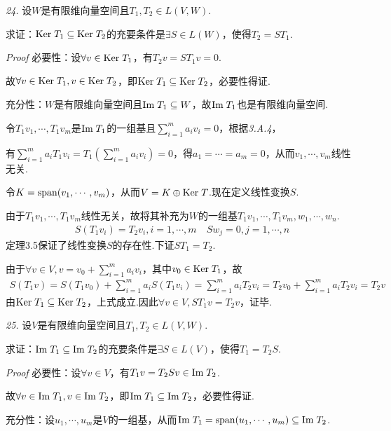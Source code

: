 \hspace*{\fill}

\textit{24.}
设\(W\)是有限维向量空间且\(T_1,T_2 \in L(V,W)\).

求证：\(\mathrm{Ker \;} T_1 \subseteq \mathrm{Ker \;} T_2\)的充要条件是\(\exists S \in L(W)\)，使得\(T_2=ST_1\).

\textit{Proof}
必要性：设\(\forall v \in \mathrm{Ker \;} T_1\)，有\(T_2v=ST_1v=0\).

故\(\forall v \in \mathrm{Ker \;} T_1, v \in \mathrm{Ker \;} T_2\)，即\(\mathrm{Ker \;} T_1 \subseteq \mathrm{Ker \;} T_2\)，必要性得证.

充分性：\(W\)是有限维向量空间且\(\mathrm{Im \;} T_1 \subseteq W\)，故\(\mathrm{Im \;} T_1\)也是有限维向量空间.

令\(T_1v_1,\cdots,T_1v_m\)是\(\mathrm{Im \;} T_1\)的一组基且\(\sum_{i=1}^m a_iv_i=0\)，根据\textit{3.A.4}，

有\(\sum_{i=1}^m a_iT_1v_i=T_1(\sum_{i=1}^m a_iv_i)=0\)，得\(a_1=\cdots=a_m=0\)，从而\(v_1,\cdots,v_m\)线性无关.

令\(K=\mathrm{span} (v_1,\cdots,v_m)\)，从而\(V=K \oplus \mathrm{Ker \;} T\).现在定义线性变换\(S\).

由于\(T_1v_1,\cdots,T_1v_m\)线性无关，故将其补充为\(W\)的一组基\(T_1v_1,\cdots,T_1v_m,w_1,\cdots,w_n\).
    \begin{align*}
        S(T_1v_i)=T_2v_i,i=1,\cdots,m \quad Sw_j=0,j=1,\cdots,n
    \end{align*}
定理3.5保证了线性变换\(S\)的存在性.下证\(ST_1=T_2\).

由于\(\forall v \in V, v=v_0+\sum_{i=1}^m a_iv_i\)，其中\(v_0 \in \mathrm{Ker \;} T_1\)，故
    \begin{align*}
        S(T_1v)=S(T_1v_0)+\sum_{i=1}^m a_iS(T_1v_i)
        =\sum_{i=1}^m a_iT_2v_i=T_2v_0+\sum_{i=1}^m a_iT_2v_i=T_2v
    \end{align*}
由\(\mathrm{Ker \;} T_1 \subseteq \mathrm{Ker \;} T_2\)，上式成立.因此\(\forall v \in V, ST_1v=T_2v\)，证毕.

\newpage

\textit{25.}
设\(V\)是有限维向量空间且\(T_1,T_2 \in L(V,W)\).

求证：\(\mathrm{Im \;} T_1 \subseteq \mathrm{Im \;} T_2\)的充要条件是\(\exists S \in L(V)\)，使得\(T_1=T_2S\).

\textit{Proof}
必要性：设\(\forall v \in V\)，有\(T_1v=T_2Sv \in \mathrm{Im \;} T_2\).

故\(\forall v \in \mathrm{Im \;} T_1, v \in \mathrm{Im \;} T_2\)，即\(\mathrm{Im \;} T_1 \subseteq \mathrm{Im \;} T_2\)，必要性得证. 

充分性：设\(u_1,\cdots,u_m\)是\(V\)的一组基，从而\(\mathrm{Im \;} T_1=\mathrm{span}(u_1,\cdots,u_m) \subseteq \mathrm{Im \;} T_2\).

